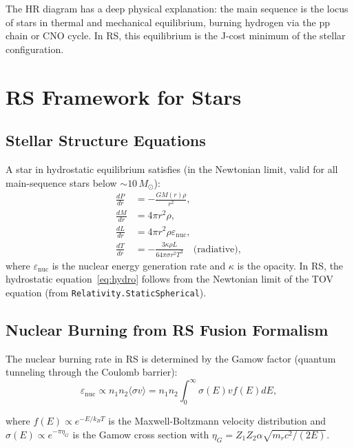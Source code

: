 \documentclass[12pt,a4paper]{article}
\theoremstyle{definition}
\theoremstyle{remark}
\begin{document}
The HR diagram has a deep physical explanation: the main sequence is
the locus of stars in thermal and mechanical equilibrium, burning
hydrogen via the pp chain or CNO cycle.  In RS, this equilibrium is
the J-cost minimum of the stellar configuration.

\section{RS Framework for Stars}
\label{sec:rs}

\subsection{Stellar Structure Equations}

A star in hydrostatic equilibrium satisfies (in the Newtonian limit,
valid for all main-sequence stars below $\sim 10\,M_\odot$):
\begin{align}
  \frac{dP}{dr} &= -\frac{G M(r) \rho}{r^2}, \label{eq:hydro} \\
  \frac{dM}{dr} &= 4\pi r^2 \rho, \label{eq:mass} \\
  \frac{dL}{dr} &= 4\pi r^2 \rho \varepsilon_\mathrm{nuc}, \label{eq:energy} \\
  \frac{dT}{dr} &= -\frac{3\kappa \rho L}{64\pi\sigma r^2 T^3}
  \quad \text{(radiative)}, \label{eq:transport}
\end{align}
where $\varepsilon_\mathrm{nuc}$ is the nuclear energy generation rate
and $\kappa$ is the opacity.  In RS, the hydrostatic equation~\eqref{eq:hydro}
follows from the Newtonian limit of the TOV equation
(from \texttt{Relativity.StaticSpherical}).

\subsection{Nuclear Burning from RS Fusion Formalism}

The nuclear burning rate in RS is determined by the Gamow factor
(quantum tunneling through the Coulomb barrier):
\begin{equation}
  \varepsilon_\mathrm{nuc} \propto n_1 n_2 \langle\sigma v\rangle
  = n_1 n_2 \int_0^\infty \sigma(E) v f(E) dE,
  \label{eq:burnrate}
\end{equation}

where $f(E) \propto e^{-E/k_BT}$ is the Maxwell-Boltzmann velocity
distribution and $\sigma(E) \propto e^{-\pi\eta_G}$ is the Gamow
cross section with $\eta_G = Z_1 Z_2 \alpha \sqrt{m_r c^2 / (2E)}$.
\end{document}
